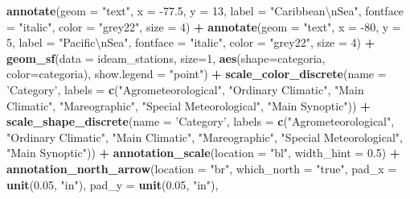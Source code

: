\documentclass[12pt,twoside]{reedthesis}
\newenvironment{Shaded}{\begin{snugshade}}{\end{snugshade}}
\newcommand{\CharTok}[1]{\textcolor[rgb]{0.31,0.60,0.02}{#1}}
\newcommand{\DataTypeTok}[1]{\textcolor[rgb]{0.13,0.29,0.53}{#1}}
\newcommand{\DecValTok}[1]{\textcolor[rgb]{0.00,0.00,0.81}{#1}}
\newcommand{\FloatTok}[1]{\textcolor[rgb]{0.00,0.00,0.81}{#1}}
\newcommand{\KeywordTok}[1]{\textcolor[rgb]{0.13,0.29,0.53}{\textbf{#1}}}
\newcommand{\NormalTok}[1]{#1}
\newcommand{\OperatorTok}[1]{\textcolor[rgb]{0.81,0.36,0.00}{\textbf{#1}}}
\newcommand{\StringTok}[1]{\textcolor[rgb]{0.31,0.60,0.02}{#1}}
\begin{document}
\begin{Shaded}
\begin{Highlighting}[]
\StringTok{  }\KeywordTok{annotate}\NormalTok{(}\DataTypeTok{geom =} \StringTok{"text"}\NormalTok{, }\DataTypeTok{x =} \FloatTok{-77.5}\NormalTok{, }\DataTypeTok{y =} \DecValTok{13}\NormalTok{, }\DataTypeTok{label =} \StringTok{"Caribbean}\CharTok{\textbackslash{}n}\StringTok{Sea"}\NormalTok{, }\DataTypeTok{fontface =} \StringTok{"italic"}\NormalTok{, }\DataTypeTok{color =} \StringTok{"grey22"}\NormalTok{, }\DataTypeTok{size =} \DecValTok{4}\NormalTok{) }\OperatorTok{+}\StringTok{ }
\StringTok{  }\KeywordTok{annotate}\NormalTok{(}\DataTypeTok{geom =} \StringTok{"text"}\NormalTok{, }\DataTypeTok{x =} \DecValTok{-80}\NormalTok{, }\DataTypeTok{y =} \DecValTok{5}\NormalTok{, }\DataTypeTok{label =} \StringTok{"Pacific}\CharTok{\textbackslash{}n}\StringTok{Sea"}\NormalTok{, }\DataTypeTok{fontface =} \StringTok{"italic"}\NormalTok{, }\DataTypeTok{color =} \StringTok{"grey22"}\NormalTok{, }\DataTypeTok{size =} \DecValTok{4}\NormalTok{) }\OperatorTok{+}
\StringTok{  }\KeywordTok{geom_sf}\NormalTok{(}\DataTypeTok{data =}\NormalTok{ ideam_stations, }\DataTypeTok{size=}\DecValTok{1}\NormalTok{, }\KeywordTok{aes}\NormalTok{(}\DataTypeTok{shape=}\NormalTok{categoria, }\DataTypeTok{color=}\NormalTok{categoria), }\DataTypeTok{show.legend =} \StringTok{"point"}\NormalTok{) }\OperatorTok{+}\StringTok{ }
\StringTok{  }\KeywordTok{scale_color_discrete}\NormalTok{(}\DataTypeTok{name =} \StringTok{'Category'}\NormalTok{, }\DataTypeTok{labels =} \KeywordTok{c}\NormalTok{(}\StringTok{"Agrometeorological"}\NormalTok{, }\StringTok{"Ordinary Climatic"}\NormalTok{, }\StringTok{"Main Climatic"}\NormalTok{, }\StringTok{"Mareographic"}\NormalTok{, }
   \StringTok{"Special Meteorological"}\NormalTok{, }\StringTok{"Main Synoptic"}\NormalTok{)) }\OperatorTok{+}
\StringTok{  }\KeywordTok{scale_shape_discrete}\NormalTok{(}\DataTypeTok{name =} \StringTok{'Category'}\NormalTok{, }\DataTypeTok{labels =} \KeywordTok{c}\NormalTok{(}\StringTok{"Agrometeorological"}\NormalTok{, }\StringTok{"Ordinary Climatic"}\NormalTok{, }\StringTok{"Main Climatic"}\NormalTok{, }\StringTok{"Mareographic"}\NormalTok{, }
   \StringTok{"Special Meteorological"}\NormalTok{, }\StringTok{"Main Synoptic"}\NormalTok{)) }\OperatorTok{+}\StringTok{  }
\StringTok{  }\KeywordTok{annotation_scale}\NormalTok{(}\DataTypeTok{location =} \StringTok{"bl"}\NormalTok{, }\DataTypeTok{width_hint =} \FloatTok{0.5}\NormalTok{) }\OperatorTok{+}\StringTok{ }
\StringTok{  }\KeywordTok{annotation_north_arrow}\NormalTok{(}\DataTypeTok{location =} \StringTok{"br"}\NormalTok{, }\DataTypeTok{which_north =} \StringTok{"true"}\NormalTok{, }\DataTypeTok{pad_x =} \KeywordTok{unit}\NormalTok{(}\FloatTok{0.05}\NormalTok{, }\StringTok{"in"}\NormalTok{), }\DataTypeTok{pad_y =} \KeywordTok{unit}\NormalTok{(}\FloatTok{0.05}\NormalTok{, }\StringTok{"in"}\NormalTok{), }

\end{Highlighting}
\end{Shaded}
\end{document}
